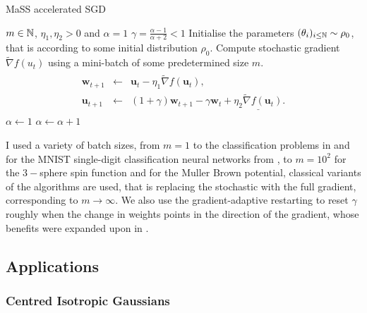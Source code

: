 \documentclass{article}
\begin{document}
\begin{examplesblock}{MaSS accelerated SGD}\label{alg: MaSS sgd}
\begin{algorithmic}
\Require $ m\in \mathbb{N} $, $ \eta_{1}, \eta_{2}>0$ and $ \alpha = 1$
\State $ \gamma = \frac{\alpha-1}{\alpha+2}<1$
\State Initialise the parameters $(\mathbf{\theta}_{i})_{i\leq \mathbb{N}} \sim \rho_{0}$, that is according to some initial distribution $ \rho_{0}$.
\State Compute stochastic gradient $\tilde{\nabla}f(u_{t}) $ using a mini-batch of some predetermined size $ m$.
\State  \begin{eqnarray}\left.\begin{array}{lll}
\mathbf{w}_{t+1} &\leftarrow& \mathbf{u}_t - \eta_1 \tilde{\nabla}f(\mathbf{u}_t), \\
\mathbf{u}_{t+1} &\leftarrow& (1+\gamma)\mathbf{w}_{t+1} - \gamma \mathbf{w}_{t} + \underline{ \eta_2 \tilde{\nabla}f(\mathbf{u}_t)}.\end{array}\right.
\end{eqnarray}
 
\State $ \alpha \leftarrow 1$
\EndIf 
\State $\alpha \leftarrow \alpha +1$
\EndWhile

\end{algorithmic}

\end{examplesblock}
  
I used a variety of batch sizes, from $m=1 $ to the classification problems in \cite{Mei_2018} and for the MNIST single-digit classification neural networks from \cite{sirignano2019meanfieldanalysislln}, to $ m=10^{2}$ for the $ 3-$sphere spin function and for the Muller Brown potential, classical variants of the algorithms are used, that is replacing the stochastic with the full gradient, corresponding to $ m \to \infty$. We also use the gradient-adaptive restarting to reset $ \gamma$ roughly when the change in weights points in the direction of the gradient, whose benefits were expanded upon in \cite{ odonoghue2012adaptiverestartacceleratedgradient}. 
\subsection{Applications}

\subsubsection{Centred Isotropic Gaussians}
\end{document}
